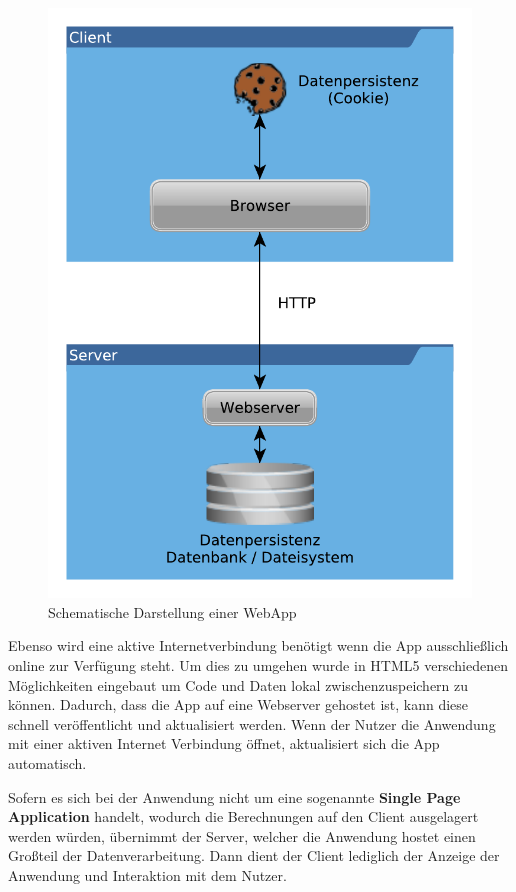 \begin{figure}[H]
	\centering
	\includegraphics[scale=0.8]{images/Webapps}
	\caption[Schematische Darstellung einer WebApp]{Schematische Darstellung einer WebApp}
	\label{Webapps}
\end{figure}

Ebenso wird eine aktive Internetverbindung benötigt wenn die App ausschließlich online zur Verfügung steht. Um dies zu umgehen wurde in HTML5 verschiedenen Möglichkeiten eingebaut um Code und Daten lokal zwischenzuspeichern zu können. Dadurch, dass die App auf eine Webserver gehostet ist, kann diese schnell veröffentlicht und aktualisiert werden. Wenn der Nutzer die Anwendung mit einer aktiven Internet Verbindung öffnet, aktualisiert sich die App automatisch. 

Sofern es sich bei der Anwendung nicht um eine sogenannte \textbf{Single Page Application} handelt, wodurch die Berechnungen auf den Client ausgelagert werden würden, übernimmt der Server, welcher die Anwendung hostet einen Großteil der Datenverarbeitung. Dann dient der Client lediglich der Anzeige der Anwendung und Interaktion mit dem Nutzer.


